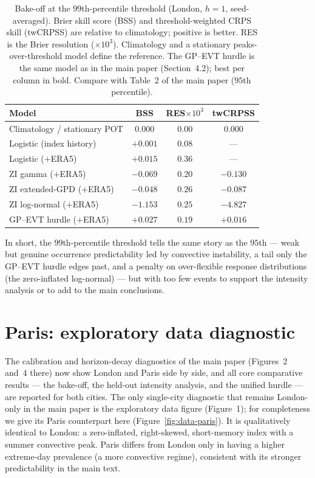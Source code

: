 \documentclass[11pt,a4paper]{article}
\begin{document}
\begin{table}[h]
\centering
\caption{Bake-off at the $99$th-percentile threshold (London, $h=1$,
seed-averaged). Brier skill score (BSS) and threshold-weighted CRPS skill
(twCRPSS) are relative to climatology; positive is better. RES is the Brier
resolution ($\times10^3$). Climatology and a stationary peaks-over-threshold
model define the reference. The GP--EVT hurdle is the same model as in the main
paper (Section~4.2); best per column in bold. Compare with Table~2 of the main
paper ($95$th percentile).}
\label{tab:supp99}
\begin{tabular}{lccc}
\toprule
\textbf{Model} & \textbf{BSS} & \textbf{RES}$\times10^3$ & \textbf{twCRPSS} \\
\midrule
Climatology / stationary POT     & $0.000$  & $0.00$ & $0.000$ \\
Logistic (index history)         & $+0.001$ & $0.08$ & --- \\
Logistic ($+$ERA5)               & $+0.015$ & $0.36$ & --- \\
ZI gamma ($+$ERA5)               & $-0.069$ & $0.20$ & $-0.130$ \\
ZI extended-GPD ($+$ERA5)        & $-0.048$ & $0.26$ & $-0.087$ \\
ZI log-normal ($+$ERA5)          & $-1.153$ & $0.25$ & $-4.827$ \\
GP--EVT hurdle ($+$ERA5)         & $\mathbf{+0.027}$ & $0.19$ & $\mathbf{+0.016}$ \\
\bottomrule
\end{tabular}
\end{table}

In short, the $99$th-percentile threshold tells the same story as the $95$th ---
weak but genuine occurrence predictability led by convective instability, a tail
only the GP--EVT hurdle edges past, and a penalty on over-flexible response
distributions (the zero-inflated log-normal) --- but
with too few events to support the intensity analysis or to add to the main
conclusions.

\section{Paris: exploratory data diagnostic}
\label{sec:supp-paris}

The calibration and horizon-decay diagnostics of the main paper (Figures~2 and~4 there) now show London and Paris side by side, and all core comparative results --- the bake-off, the held-out intensity analysis, and the unified hurdle --- are reported for both cities. The only single-city diagnostic that remains London-only in the main paper is the exploratory data figure (Figure~1); for completeness we give its Paris counterpart here (Figure~\ref{fig:data-paris}). It is qualitatively identical to London: a zero-inflated, right-skewed, short-memory index with a summer convective peak. Paris differs from London only in having a higher extreme-day prevalence (a more convective regime), consistent with its stronger predictability in the main text.
\end{document}
